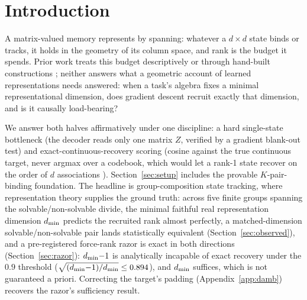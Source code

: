 \section{Introduction}
\label{sec:intro}

A matrix-valued memory represents by spanning: whatever a $d \times d$
state binds or tracks, it holds in the geometry of its column space, and
rank is the budget it spends. Prior work treats this budget
descriptively \citep{nazari2026rank, sun2026staterank} or through
hand-built constructions \citep{nichani2025factual}; neither answers
what a geometric account of learned representations needs answered:
when a task's algebra fixes a minimal representational dimension, does
gradient descent recruit exactly that dimension, and is it causally
load-bearing?

We answer both halves affirmatively under one discipline: a hard
single-state bottleneck (the decoder reads only one matrix $Z$, verified
by a gradient blank-out test) and exact-continuous-recovery scoring
(cosine against the true continuous target, never argmax over a codebook,
which would let a rank-1 state recover on the order of $d$ associations
\citep{nichani2025factual}). Section~\ref{sec:setup} includes the
provable $K$-pair-binding foundation. The headline is
group-composition state tracking, where representation theory
supplies the ground truth: across five finite groups spanning the
solvable/non-solvable divide, the minimal faithful real representation
dimension $d_{\min}$ predicts the recruited rank almost perfectly, a
matched-dimension solvable/non-solvable pair lands statistically
equivalent (Section~\ref{sec:observed}),
and a pre-registered force-rank
razor is exact in both directions (Section~\ref{sec:razor}): $d_{\min}{-}1$
is analytically incapable of exact recovery under the $0.9$ threshold
($\sqrt{(d_{\min}{-}1)/d_{\min}} \le 0.894$), and $d_{\min}$ suffices, which is not
guaranteed a priori.
Correcting the target's padding (Appendix~\ref{app:damb}) recovers the
razor's sufficiency result.
